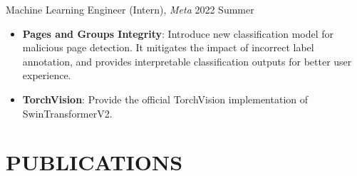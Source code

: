 \documentclass[letterpaper,11pt]{article}
\begin{document}
Machine Learning Engineer (Intern), \textit{Meta}  \hfill 2022 Summer
\begin{itemize}
\item[]
\vspace{-5pt}\textbf{Pages and Groups Integrity}:
Introduce new classification model for malicious page detection. It mitigates the impact of incorrect label annotation, and provides interpretable classification outputs for better user experience.
\item[]
\vspace{-5pt}\textbf{TorchVision}:
Provide the official TorchVision implementation of SwinTransformerV2.
\end{itemize}


\section{PUBLICATIONS}
\end{document}

